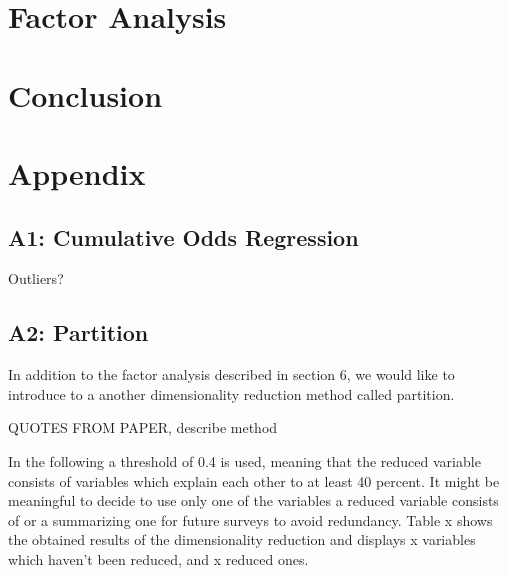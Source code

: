 \documentclass[12pt, a4paper, titlepage]{article}\usepackage[]{graphicx}\usepackage[]{color}
\begin{document}
\section{Factor Analysis}

\section{Conclusion}

\printbibliography

\section{Appendix}

\subsection{A1: Cumulative Odds Regression} 
 
Outliers? 



\subsection{A2: Partition}

In addition to the factor analysis described in section 6, we would like to introduce to a another dimensionality reduction method called partition. 

QUOTES FROM PAPER, describe method 

In the following a threshold of 0.4 is used, meaning that the reduced variable consists of variables which explain each other to at least 40 percent. It might be meaningful to decide to use only one of the variables a reduced variable consists of or a summarizing one for future surveys to avoid redundancy. Table x shows the obtained results of the dimensionality reduction and displays x variables which haven't been reduced, and x reduced ones.    
\end{document}
